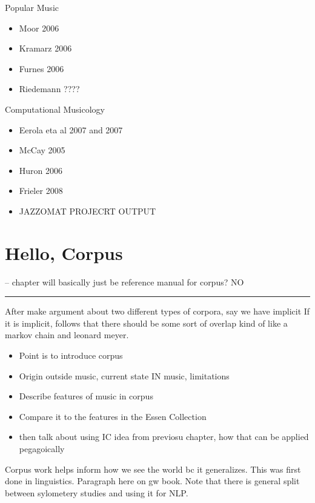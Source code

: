 \documentclass[]{book}
\providecommand{\tightlist}{%
  \setlength{\itemsep}{0pt}\setlength{\parskip}{0pt}}
\begin{document}
Popular Music

\begin{itemize}
\tightlist
\item
  Moor 2006
\item
  Kramarz 2006
\item
  Furnes 2006
\item
  Riedemann ????
\end{itemize}

Computational Musicology

\begin{itemize}
\tightlist
\item
  Eerola eta al 2007 and 2007
\item
  McCay 2005
\item
  Huron 2006
\item
  Frieler 2008
\item
  JAZZOMAT PROJECRT OUTPUT
\end{itemize}

\hypertarget{hello-corpus}{%
\chapter{Hello, Corpus}\label{hello-corpus}}

-- chapter will basically just be reference manual for corpus?
NO

\begin{center}\rule{0.5\linewidth}{\linethickness}\end{center}

After make argument about two different types of corpora, say we have implicit
If it is implicit, follows that there should be some sort of overlap
kind of like a markov chain and leonard meyer.

\begin{itemize}
\tightlist
\item
  Point is to introduce corpus
\item
  Origin outside music, current state IN music, limitations
\item
  Describe features of music in corpus
\item
  Compare it to the features in the Essen Collection
\item
  then talk about using IC idea from previosu chapter, how that can be applied pegagoically
\end{itemize}

Corpus work helps inform how we see the world bc it generalizes.
This was first done in linguistics.
Paragraph here on gw book.
Note that there is general split between sylometery studies and using it for NLP.
\end{document}
